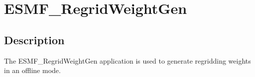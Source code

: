 \section{ESMF\_RegridWeightGen}
\label{sec:ESMF_RegridWeightGen}

\subsection{Description}

The ESMF\_RegridWeightGen application is used to generate regridding weights in an offline mode.
